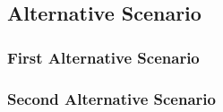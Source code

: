 \documentclass[notitlepage]{article}
\begin{document}
\begin{comment}
		\noindent If any information is exchanged, be specific about what is passed back and forth. For example, it is not interesting to say that the client/user enter his/her account data to access his/her bank account. It is better to say the client gives the account's number and the password.

		\noindent A picture is sometimes worth a thousand words, though there is no substitute for clean, clear prose.  If it improves clarity, feel free to paste graphical depictions of user interfaces, process flows or other figures into the use case.  If a flow chart is useful to present a complex decision process, by all means use it!  Similarly for state-dependent behavior, a state-transition diagram often clarifies the behavior of a system better than pages upon pages of text.  Use the right presentation medium for your problem, but be wary of using terminology, notations or figures that your audience may not understand.  Remember that your purpose is to clarify, not obscure.		
	\end{color}
\end{comment}

\subsection{Alternative Scenario}\label{subsec:alternative:scenario}
\subsubsection{First Alternative Scenario}

\begin{comment}
	\begin{color}{blue}
		\noindent More complex alternatives are described in a separate section, referred to in the Main Scenario  subsection of the Scenarios section.  Think of the Alternative Scenario subsections like alternative behaviors. In this case, each alternative flow represents an alternative behavior usually due to exceptions that occur in the main flow. 

		\noindent An alternative flow may be as long as necessary to describe the events associated with its behavior. When an alternative flow ends, the events of the main flow of events are resumed unless otherwise stated.
	\end{color}
\end{comment}

\subsubsection{Second Alternative Scenario}
\end{document}
